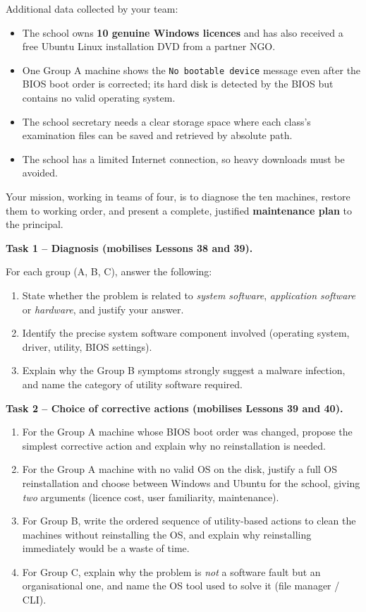 \documentclass[11pt]{article}
\newcounter{popsec}
\newcounter{popsub}
\newcommand{\courssub}[1]{%
  \stepcounter{popsub}%
  \par\vspace{9pt}\noindent{\popxbold\fontsize{11.5}{13}\selectfont\color{popink}{\color{poporange}\thepopsec.\thepopsub}\hspace{6pt}#1}\par\nopagebreak\vspace{4pt}
}
\begin{document}
\begin{experience}
Additional data collected by your team:
\begin{itemize}
\item The school owns \textbf{10 genuine Windows licences} and has also received a free Ubuntu Linux installation DVD from a partner NGO.
\item One Group A machine shows the \texttt{No bootable device} message even after the BIOS boot order is corrected; its hard disk is detected by the BIOS but contains no valid operating system.
\item The school secretary needs a clear storage space where each class's examination files can be saved and retrieved by absolute path.
\item The school has a limited Internet connection, so heavy downloads must be avoided.
\end{itemize}

Your mission, working in teams of four, is to diagnose the ten machines, restore them to working order, and present a complete, justified \textbf{maintenance plan} to the principal.
\end{experience}

\courssub{Tasks}

\textbf{Task 1 -- Diagnosis (mobilises Lessons 38 and 39).}\par
For each group (A, B, C), answer the following:
\begin{enumerate}
\item State whether the problem is related to \emph{system software}, \emph{application software} or \emph{hardware}, and justify your answer.
\item Identify the precise system software component involved (operating system, driver, utility, BIOS settings).
\item Explain why the Group B symptoms strongly suggest a malware infection, and name the category of utility software required.
\end{enumerate}

\textbf{Task 2 -- Choice of corrective actions (mobilises Lessons 39 and 40).}\par
\begin{enumerate}
\item For the Group A machine whose BIOS boot order was changed, propose the simplest corrective action and explain why no reinstallation is needed.
\item For the Group A machine with no valid OS on the disk, justify a full OS reinstallation and choose between Windows and Ubuntu for the school, giving \emph{two} arguments (licence cost, user familiarity, maintenance).
\item For Group B, write the ordered sequence of utility-based actions to clean the machines without reinstalling the OS, and explain why reinstalling immediately would be a waste of time.
\item For Group C, explain why the problem is \emph{not} a software fault but an organisational one, and name the OS tool used to solve it (file manager / CLI).
\end{enumerate}
\end{document}
